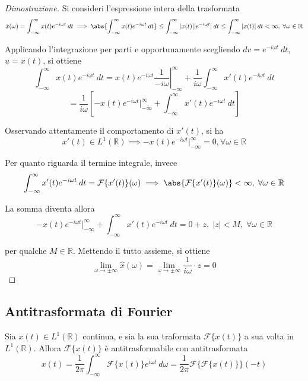     \begin{proof}[Dimostrazione]
        Si consideri l'espressione intera della trasformata
        \[
            \hat{x}(\omega) = \int_{-\infty}^{\infty} x(t) e^{-i \omega t} \: dt \implies \abs{\int_{-\infty}^{\infty} x(t) e^{-i \omega t} \: dt} \leq \int_{-\infty}^{\infty} |x(t)| |e^{-i \omega t}| \: dt \leq \int_{-\infty}^{\infty} |x(t)| \: dt < \infty, \; \forall \omega \in \mathbb{R}
        \]

        Applicando l'integrazione per parti e opportunamente scegliendo $dv = e^{-i \omega t} \: dt$, $u = x(t)$, si ottiene
        \[
            \int_{-\infty}^{\infty} x(t) e^{-i \omega t} \: dt = x(t) e^{-i \omega t} \left. \frac{1}{-i \omega} \right\rvert_{-\infty}^{\infty} + \frac{1}{i \omega} \int_{-\infty}^{\infty} x'(t) e^{-i \omega t} \: dt
        \]
        \[
            = \frac{1}{i \omega} \left[-x(t) e^{-i \omega t} \rvert_{-\infty}^{\infty} + \int_{-\infty}^{\infty} x'(t) e^{-i \omega t} \: dt\right]
        \]

        Osservando attentamente il comportamento di $x'(t)$, si ha
        \[
            x'(t) \in L^{1}(\mathbb{R}) \implies -x(t) e^{-i \omega t} \rvert_{-\infty}^{\infty} = 0, \forall \omega \in \mathbb{R}
        \]

        Per quanto riguarda il termine integrale, invece
        \[
            \int_{-\infty}^{\infty} x'(t) e^{-i \omega t} \: dt = \mathcal{F}\{x'(t)\}(\omega) \implies \abs{\mathcal{F}\{x'(t)\}(\omega)} < \infty, \; \forall \omega \in \mathbb{R}
        \]

        La somma diventa allora
        \[
            -x(t) e^{-i \omega t} \rvert_{-\infty}^{\infty} + \int_{-\infty}^{\infty} x'(t) e^{-i \omega t} \: dt = 0 + z, \; |z| < M, \; \forall \omega \in \mathbb{R}
        \]

        per qualche $M \in \mathbb{R}$. Mettendo il tutto assieme, si ottiene
        \[
            \lim_{\omega \rightarrow \pm \infty} \hat{x}(\omega) = \lim_{\omega \rightarrow \pm \infty} \frac{1}{i \omega} \cdot z = 0
        \]
    \end{proof}

    \subsection{Antitrasformata di Fourier}
        \begin{theorem}
            Sia $x(t) \in L^{1}(\mathbb{R})$ continua, e sia la sua traformata $\mathcal{F}\{x(t)\}$ a sua volta in $L^{1}(\mathbb{R})$.
            Allora $\mathcal{F}\{x(t)\}$ è antitrasformabile con antitrasformata
            \[
                x(t) = \frac{1}{2 \pi} \int_{-\infty}^{\infty} \mathcal{F}\{x(t)\} e^{i \omega t} \: d\omega = \frac{1}{2 \pi} \mathcal{F}\{\mathcal{F}\{x(t)\}\}(-t)
            \]
        \end{theorem}

